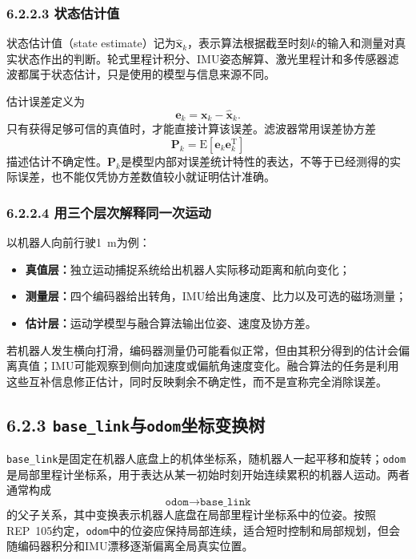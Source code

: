 \documentclass[UTF8,zihao=-4]{ctexart}
\newcommand{\vect}[1]{\bm{#1}}
\begin{document}
\subsubsection*{6.2.2.3 状态估计值}

状态估计值（state estimate）记为$\hat{\vect{x}}_k$，表示算法根据截至时刻$k$的输入和测量对真实状态作出的判断。轮式里程计积分、IMU姿态解算、激光里程计和多传感器滤波都属于状态估计，只是使用的模型与信息来源不同。

估计误差定义为
\begin{equation}
  \vect{e}_k=\vect{x}_k-\hat{\vect{x}}_k.
  \label{eq:estimation-error}
\end{equation}
只有获得足够可信的真值时，才能直接计算该误差。滤波器常用误差协方差
\begin{equation}
  \vect{P}_k=\mathrm{E}\!\left[\vect{e}_k\vect{e}_k^{\mathrm T}\right]
  \label{eq:state-covariance}
\end{equation}
描述估计不确定性。$\vect{P}_k$是模型内部对误差统计特性的表达，不等于已经测得的实际误差，也不能仅凭协方差数值较小就证明估计准确。

\subsubsection*{6.2.2.4 用三个层次解释同一次运动}

以机器人向前行驶\SI{1}{m}为例：
\begin{itemize}
  \item \textbf{真值层：}独立运动捕捉系统给出机器人实际移动距离和航向变化；
  \item \textbf{测量层：}四个编码器给出转角，IMU给出角速度、比力以及可选的磁场测量；
  \item \textbf{估计层：}运动学模型与融合算法输出位姿、速度及协方差。
\end{itemize}

若机器人发生横向打滑，编码器测量仍可能看似正常，但由其积分得到的估计会偏离真值；IMU可能观察到侧向加速度或偏航角速度变化。融合算法的任务是利用这些互补信息修正估计，同时反映剩余不确定性，而不是宣称完全消除误差。

\subsection*{6.2.3 \texttt{base\_link}与\texttt{odom}坐标变换树}

\texttt{base\_link}是固定在机器人底盘上的机体坐标系，随机器人一起平移和旋转；\texttt{odom}是局部里程计坐标系，用于表达从某一初始时刻开始连续累积的机器人运动。两者通常构成
\begin{equation}
  \texttt{odom}\rightarrow\texttt{base\_link}
  \label{eq:odom-base-link-tree}
\end{equation}
的父子关系，其中变换表示机器人底盘在局部里程计坐标系中的位姿。按照REP~105约定，\texttt{odom}中的位姿应保持局部连续，适合短时控制和局部规划，但会随编码器积分和IMU漂移逐渐偏离全局真实位置\cite{rep105}。
\end{document}
